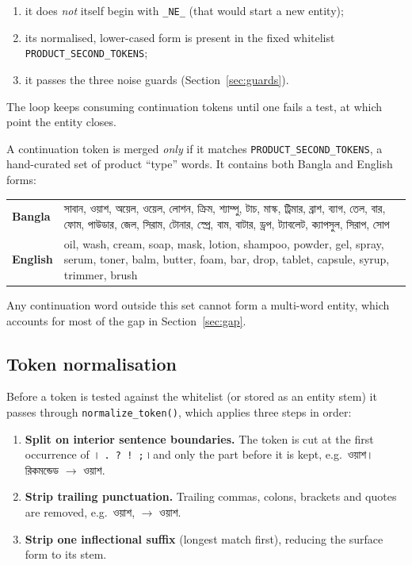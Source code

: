 \documentclass[11pt]{article}
\newcommand{\bn}[1]{{\bnfont #1}}
\begin{document}
\begin{enumerate}
  \item it does \emph{not} itself begin with \texttt{\_NE\_} (that would start a
        new entity);
  \item its normalised, lower-cased form is present in the fixed whitelist
        \texttt{PRODUCT\_SECOND\_TOKENS};
  \item it passes the three noise guards (Section~\ref{sec:guards}).
\end{enumerate}

The loop keeps consuming continuation tokens until one fails a test, at which
point the entity closes.

\begin{note}
A continuation token is merged \emph{only} if it matches
\texttt{PRODUCT\_SECOND\_TOKENS}, a hand-curated set of product ``type'' words.
It contains both Bangla and English forms:

\medskip
\begin{tabular}{@{}p{2.0cm}p{11.5cm}@{}}
\textbf{Bangla} & \bn{সাবান}, \bn{ওয়াশ}, \bn{অয়েল}, \bn{ওয়েল}, \bn{লোশন},
  \bn{ক্রিম}, \bn{শ্যাম্পু}, \bn{টাচ}, \bn{মাস্ক}, \bn{ট্রিমার}, \bn{ব্রাশ},
  \bn{ব্যাগ}, \bn{তেল}, \bn{বার}, \bn{ফোম}, \bn{পাউডার}, \bn{জেল}, \bn{সিরাম},
  \bn{টোনার}, \bn{স্প্রে}, \bn{বাম}, \bn{বাটার}, \bn{ড্রপ}, \bn{ট্যাবলেট},
  \bn{ক্যাপসুল}, \bn{সিরাপ}, \bn{সোপ} \\[4pt]
\textbf{English} & oil, wash, cream, soap, mask, lotion, shampoo, powder, gel,
  spray, serum, toner, balm, butter, foam, bar, drop, tablet, capsule, syrup,
  trimmer, brush \\
\end{tabular}

\medskip
Any continuation word outside this set cannot form a multi-word entity, which
accounts for most of the gap in Section~\ref{sec:gap}.
\end{note}

\subsection{Token normalisation}
Before a token is tested against the whitelist (or stored as an entity stem) it
passes through \texttt{normalize\_token()}, which applies three steps in order:

\begin{enumerate}
  \item \textbf{Split on interior sentence boundaries.} The token is cut at the
        first occurrence of \bn{।} \texttt{. ? ! ;} \bn{৷} and only the part
        before it is kept, e.g.\ \bn{ওয়াশ।রিকমন্ডেড} $\rightarrow$ \bn{ওয়াশ}.
  \item \textbf{Strip trailing punctuation.} Trailing commas, colons, brackets
        and quotes are removed, e.g.\ \bn{ওয়াশ,} $\rightarrow$ \bn{ওয়াশ}.
  \item \textbf{Strip one inflectional suffix} (longest match first), reducing
        the surface form to its stem.
\end{enumerate}
\end{document}
